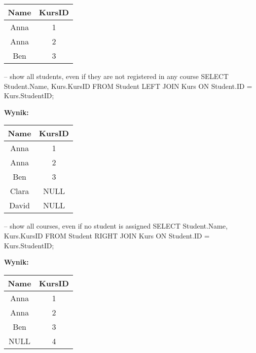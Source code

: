 \begin{center}
\begin{tabular}{|c|c|}
    \hline
    \textbf{Name} & \textbf{KursID} \\
    \hline
    Anna  & 1 \\
    Anna  & 2 \\
    Ben   & 3 \\
    \hline
\end{tabular}
\end{center}

\begin{sql}
-- show all students, even if they are not registered in any course
SELECT Student.Name, Kurs.KursID
    FROM Student
    LEFT JOIN Kurs ON Student.ID = Kurs.StudentID;
\end{sql}

\textbf{Wynik:}
\begin{center}
\begin{tabular}{|c|c|}
    \hline
    \textbf{Name} & \textbf{KursID} \\
    \hline
    Anna  & 1 \\
    Anna  & 2 \\
    Ben   & 3 \\
    Clara & NULL \\
    David & NULL \\
    \hline
\end{tabular}
\end{center}

\begin{sql}
-- show all courses, even if no student is assigned
SELECT Student.Name, Kurs.KursID
    FROM Student
    RIGHT JOIN Kurs ON Student.ID = Kurs.StudentID;
\end{sql}

\textbf{Wynik:}
\begin{center}
\begin{tabular}{|c|c|}
    \hline
    \textbf{Name} & \textbf{KursID} \\
    \hline
    Anna & 1 \\
    Anna & 2 \\
    Ben  & 3 \\
    NULL & 4 \\ %
    \hline
\end{tabular}
\end{center}

